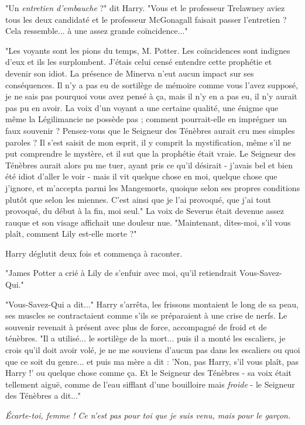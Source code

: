 "Un \emph{entretien d'embauche}  ?" dit Harry. "Vous et le professeur Trelawney aviez tous les deux candidaté et le professeur McGonagall faisait passer l'entretien ? Cela ressemble... à une assez grande coïncidence..."

"Les voyants sont les pions du temps, M. Potter. Les coïncidences sont indignes d'eux et ils les surplombent. J'étais celui censé entendre cette prophétie et devenir son idiot. La présence de Minerva n'eut aucun impact sur ses conséquences. Il n'y a pas eu de sortilège de mémoire comme vous l'avez supposé, je ne sais pas pourquoi vous avez pensé à ça, mais il n'y en a pas eu, il n'y aurait pas pu en avoir. La voix d'un voyant a une certaine qualité, une énigme que même la Légilimancie ne possède pas ; comment pourrait-elle en imprégner un faux souvenir ? Pensez-vous que le Seigneur des Ténèbres aurait cru mes simples paroles ? Il s'est saisit de mon esprit, il y comprit la mystification, même s'il ne put comprendre le mystère, et il sut que la prophétie était vraie. Le Seigneur des Ténèbres aurait alors pu me tuer, ayant pris ce qu'il désirait - j'avais bel et bien été idiot d'aller le voir - mais il vit quelque chose en moi, quelque chose que j'ignore, et m'accepta parmi les Mangemorts, quoique selon ses propres conditions plutôt que selon les miennes. C'est ainsi que je l'ai provoqué, que j'ai tout provoqué, du début à la fin, moi seul." La voix de Severus était devenue assez rauque et son visage affichait une douleur nue. "Maintenant, dites-moi, s'il vous plaît, comment Lily est-elle morte ?"

Harry déglutit deux fois et commença à raconter.

"James Potter a crié à Lily de s'enfuir avec moi, qu'il retiendrait Vous-Savez-Qui."

"Vous-Savez-Qui a dit..." Harry s'arrêta, les frissons montaient le long de sa peau, ses muscles se contractaient comme s'ils se préparaient à une crise de nerfs. Le souvenir revenait à présent avec plus de force, accompagné de froid et de ténèbres. "Il a utilisé... le sortilège de la mort... puis il a monté les escaliers, je crois qu'il doit avoir volé, je ne me souviens d'aucun pas dans les escaliers ou quoi que ce soit du genre... et puis ma mère a dit : 'Non, pas Harry, s'il vous plaît, pas Harry !' ou quelque chose comme ça. Et le Seigneur des Ténèbres - sa voix était tellement aiguë, comme de l'eau sifflant d'une bouilloire mais \emph{froide } - le Seigneur des Ténèbres a dit..."

\emph{Écarte-toi, femme ! Ce n'est pas pour toi que je suis venu, mais pour le garçon.} 

